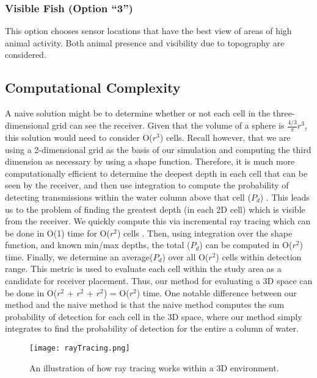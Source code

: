\subsubsection{Visible Fish (Option “3”)}
This option chooses sensor locations that have the best view of areas of high animal activity.  Both animal presence and visibility due to topography are considered.

\subsection{Computational Complexity}
\label{computationalComplexity}
A naive solution might be to determine whether or not each cell in the three-dimensional grid can see the receiver.  Given that the volume of a sphere is $\frac{4/3}\pi r^{3}$, this solution would need to consider O($r^{3}$) cells.  Recall however, that we are using a 2-dimensional grid as the basis of our simulation and computing the third dimension as necessary by using a shape function.  Therefore, it is much more computationally efficient to determine the deepest depth in each cell that can be seen by the receiver, and then use integration to compute the probability of detecting transmissions within the water column above that cell ($P_{d}$) .  This leads us to the problem of finding the greatest depth (in each 2D cell) which is visible from the receiver.  We quickly compute this via incremental ray tracing which can be done in O(1) time for O($r^{2}$) cells \cite{Akbarzadeh2013}.   Then, using integration over the shape function, and known min/max depths, the total ($P_{d}$) can be computed in O($r^{2}$) time.  Finally, we determine an average($P_{d}$)  over all O($r^{2}$) cells within detection range.  This metric is used to evaluate each cell within the study area as a candidate for receiver placement.  Thus, our method for evaluating a 3D space can be done in  O($r^{2}$ + $r^{2}$ + $r^{2}$) = O($r^{2}$) time.  One notable difference between our method and the naive method is that the naive method computes the sum probability of detection for each cell in the 3D space, where our method simply integrates to find the probability of detection for the entire a column of water.  


\begin{figure}[t]
	\label{rayTracing}
	\centering
	\texttt{[image: rayTracing.png]}
	\caption{An illustration of how ray tracing works within a 3D environment. \cite{Akbarzadeh2013}}
\end{figure}

